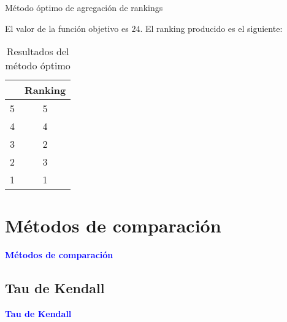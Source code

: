 \documentclass[10pt]{beamer}
\begin{document}
	\begin{frame}{Método óptimo de agregación de rankings}
		\begin{ejemplo}[continuación]
			
			El valor de la función objetivo es $24$. El ranking producido es el siguiente:
			
			\begin{table}[h]
				\centering
				\caption{Resultados del método óptimo}
				\label{tbl:optimo_resultados}
				\begin{tabular}{@{}cc@{}}
					\cmidrule(l){2-2}
					& Ranking \\ \midrule
					5 & 5       \\
					4 & 4       \\
					3 & 2       \\
					2 & 3       \\
					1 & 1       \\ \bottomrule
				\end{tabular}
			\end{table}
			
			
		\end{ejemplo}
	\end{frame}
	
	\section{Métodos de comparación}
	
	\begin{frame}
		\begin{center}
			\Huge\textbf{\textsf{\textcolor{blue}{Métodos de comparación}}}
		\end{center}
	\end{frame}
	
	\subsection{Tau de Kendall}
	
	\begin{frame}
		\begin{center}
			\Huge\textbf{\textsf{\textcolor{blue}{Tau de Kendall}}}
		\end{center}
	\end{frame}
	
\end{document}
